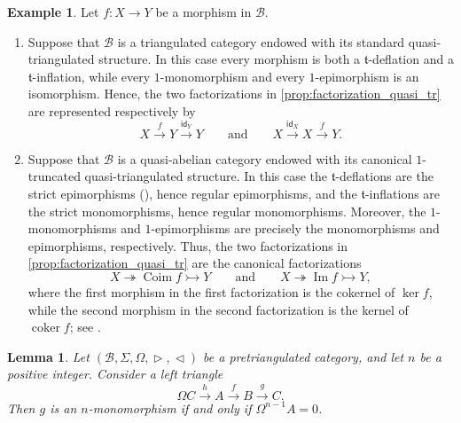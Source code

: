 \documentclass[a4paper,reqno,10pt]{amsart}
\newtheorem{lemma}[lemma]{Lemma}
\theoremstyle{definition}
\theoremstyle{definition}
\theoremstyle{definition}
\theoremstyle{definition}
\newtheorem{example}[example]{Example}
\theoremstyle{plain}
\newcommand{\id}{\mathsf{id}}
\newcommand{\ft}{\mathfrak{t}}
\newcommand{\CB}{\mathcal{B}}
\begin{document}
\begin{example}
Let $f\colon X\to Y$ be a morphism in $\CB$.
\begin{enumerate}
    \item Suppose that $\CB$ is a triangulated category endowed with
    its standard quasi-triangulated structure. In this case every
    morphism is both a $\ft$-deflation and a $\ft$-inflation, while
    every $1$-monomorphism and every $1$-epimorphism is an
    isomorphism. Hence, the two factorizations in
    \cref{prop:factorization_quasi_tr} are represented respectively by
    \[
    X\xrightarrow{f}Y\xrightarrow{\id_Y}Y
    \qquad\text{and}\qquad
    X\xrightarrow{\id_X}X\xrightarrow{f}Y.
    \]

    \item Suppose that $\CB$ is a quasi-abelian category endowed with
    its canonical $1$-truncated quasi-triangulated structure. In this
    case the $\ft$-deflations are the strict epimorphisms (\cite[Definition~1.1.1]{Sch99}), hence regular
    epimorphisms, and the $\ft$-inflations are the strict
    monomorphisms, hence regular monomorphisms. Moreover, the
    $1$-monomorphisms and $1$-epimorphisms are precisely the
    monomorphisms and epimorphisms, respectively. Thus, the two
    factorizations in \cref{prop:factorization_quasi_tr} are the
    canonical factorizations
    \[
    X\twoheadrightarrow\operatorname{Coim}f
    \rightarrowtail Y
    \qquad\text{and}\qquad
    X\twoheadrightarrow\operatorname{Im}f
    \rightarrowtail Y,
    \]
    where the first morphism in the first factorization is the
    cokernel of $\ker f$, while the second morphism in the second
    factorization is the kernel of $\operatorname{coker}f$; see
    \cite[Remark~1.1.2(b) and Proposition~1.1.4]{Sch99}.
\end{enumerate}
\end{example}

\normalcolor

\begin{lemma}
\label{lem:chara_n-mono_ker}
Let $(\CB,\Sigma,\Omega,\vartriangleright,\vartriangleleft)$ be a
pretriangulated category, and let $n$ be a positive integer.
Consider a left triangle
$$
\Omega C \xrightarrow{h} A
\xrightarrow{f} B
\xrightarrow{g} C.
$$
Then $g$ is an $n$-monomorphism if and only if
$\Omega^{n-1}A=0$.
\end{lemma}
\end{document}
